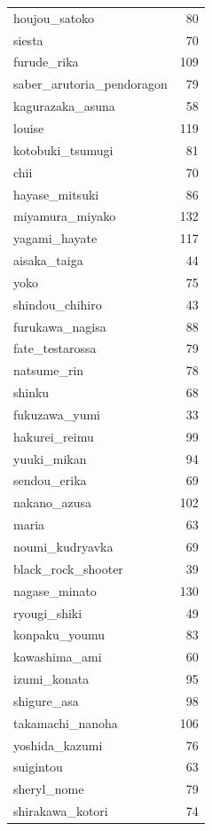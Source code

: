 \documentclass[11.5pt]{article}
\begin{document}
\begin{supertabular}[h!]{lr}
        houjou\_satoko & 80 \\
        siesta & 70 \\
        furude\_rika & 109 \\
        saber\_arutoria\_pendoragon & 79 \\
        kagurazaka\_asuna & 58 \\
        louise & 119 \\
        kotobuki\_tsumugi & 81 \\
        chii & 70 \\
        hayase\_mitsuki & 86 \\
        miyamura\_miyako & 132 \\
        yagami\_hayate & 117 \\
        aisaka\_taiga & 44 \\
        yoko & 75 \\
        shindou\_chihiro & 43 \\
        furukawa\_nagisa & 88 \\
        fate\_testarossa & 79 \\
        natsume\_rin & 78 \\
        shinku & 68 \\
        fukuzawa\_yumi & 33 \\
        hakurei\_reimu & 99 \\
        yuuki\_mikan & 94 \\
        sendou\_erika & 69 \\
        nakano\_azusa & 102 \\
        maria & 63 \\
        noumi\_kudryavka & 69 \\
        black\_rock\_shooter & 39 \\
        nagase\_minato & 130 \\
        ryougi\_shiki & 49 \\
        konpaku\_youmu & 83 \\
        kawashima\_ami & 60 \\
        izumi\_konata & 95 \\
        shigure\_asa & 98 \\
        takamachi\_nanoha & 106 \\
        yoshida\_kazumi & 76 \\
        suigintou & 63 \\
        sheryl\_nome & 79 \\
        shirakawa\_kotori & 74 \\

\end{supertabular}
\end{document}
